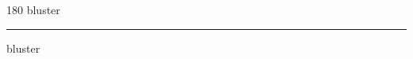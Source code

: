 
\begin{frame}
\begin{center}
\begin{turn}{180}
{\fontsize{2.5cm}{1em}\selectfont bluster}
\end{turn}
\vspace{1em}\par  
\hrule
\vspace{1em}\par  
{\fontsize{2.5cm}{1em}\selectfont bluster}
\end{center}
\end{frame}
